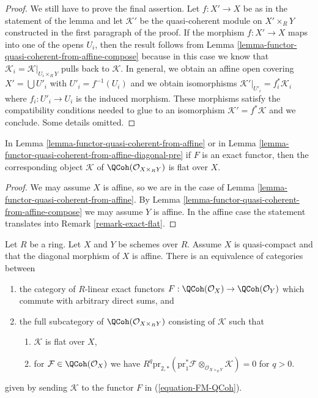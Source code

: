 \begin{proof}
\medskip\noindent
We still have to prove the final assertion. Let $f : X' \to X$
be as in the statement of the lemma and let $\mathcal{K}'$
be the quasi-coherent module on $X' \times_R Y$ constructed
in the first paragraph of the proof. If the morphism
$f : X' \to X$ maps into one of the opens $U_i$, then the
result follows from
Lemma \ref{lemma-functor-quasi-coherent-from-affine-compose}
because in this case we know
that $\mathcal{K}_i = \mathcal{K}|_{U_i \times_R Y}$
pulls back to $\mathcal{K}$. In general, we obtain an
affine open covering $X' = \bigcup U'_i$ with $U'_i = f^{-1}(U_i)$
and we obtain isomorphisms
$\mathcal{K}'|_{U'_i} = f_i^*\mathcal{K}_i$ where
$f_i : U'_i \to U_i$ is the induced morphism.
These morphisms satisfy the compatibility conditions needed
to glue to an isomorphism $\mathcal{K}' = f^*\mathcal{K}$
and we conclude. Some details omitted.
\end{proof}

\begin{lemma}
\label{lemma-coh-noetherian-from-affine-flat}
In Lemma \ref{lemma-functor-quasi-coherent-from-affine}
or in Lemma \ref{lemma-functor-quasi-coherent-from-affine-diagonal-pre}
if $F$ is an exact functor, then the corresponding object
$\mathcal{K}$ of $\QCoh(\mathcal{O}_{X \times_R Y})$ is flat over $X$.
\end{lemma}

\begin{proof}
We may assume $X$ is affine, so we are in the case of
Lemma \ref{lemma-functor-quasi-coherent-from-affine}.
By Lemma \ref{lemma-functor-quasi-coherent-from-affine-compose}
we may assume $Y$ is affine. In the affine case the statement
translates into Remark \ref{remark-exact-flat}.
\end{proof}

\begin{lemma}
\label{lemma-functor-quasi-coherent-from-affine-diagonal}
Let $R$ be a ring. Let $X$ and $Y$ be schemes over $R$. Assume $X$ is
quasi-compact and that the diagonal morphism of $X$ is affine.
There is an equivalence of categories between
\begin{enumerate}
\item the category of $R$-linear exact functors
$F : \QCoh(\mathcal{O}_X) \to \QCoh(\mathcal{O}_Y)$
which commute with arbitrary direct sums, and
\item the full subcategory of $\QCoh(\mathcal{O}_{X \times_R Y})$ consisting
of $\mathcal{K}$ such that
\begin{enumerate}
\item $\mathcal{K}$ is flat over $X$,
\item for $\mathcal{F} \in \QCoh(\mathcal{O}_X)$ we have
$R^q\text{pr}_{2, *}(\text{pr}_1^*\mathcal{F}
\otimes_{\mathcal{O}_{X \times_R Y}} \mathcal{K}) = 0$ for $q > 0$.
\end{enumerate}
\end{enumerate}
given by sending $\mathcal{K}$ to the functor $F$ in (\ref{equation-FM-QCoh}).
\end{lemma}


